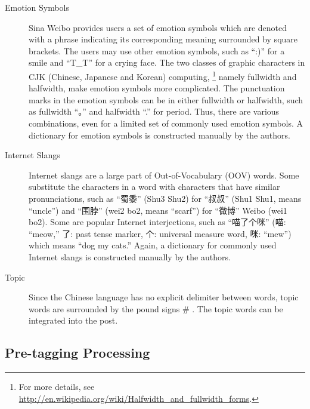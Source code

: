 \documentclass[11pt]{article}
\newcommand{\1}[1]{{\mathbf 1}\left\{#1\right\}}        %
\begin{document}
\begin{description}
\item[Emotion Symbols] Sina Weibo provides users a set of emotion symbols which are denoted with a phrase indicating its corresponding meaning surrounded by square brackets. The users may use other emotion symbols, such as ``:)'' for a smile and ``T\_T'' for a crying face. 
The two classes of graphic characters in CJK (Chinese, Japanese and Korean) computing,
\footnote{For more details, see \url{http://en.wikipedia.org/wiki/Halfwidth_and_fullwidth_forms}.}
 namely fullwidth and halfwidth, make emotion symbols more complicated. The punctuation marks in the emotion symbols can be in either fullwidth or halfwidth, such as fullwidth ``。'' and halfwidth ``.'' for period. Thus, there are various combinations, even for a limited set of commonly used emotion symbols. A dictionary for emotion symbols is constructed manually by the authors.
 
\item[Internet Slangs] 
Internet slangs are a large part of Out-of-Vocabulary (OOV) words. Some substitute the characters in a word with characters that have similar pronunciations, such as ``蜀黍'' (Shu3 Shu2) for ``叔叔'' (Shu1 Shu1, means ``uncle'') and ``围脖'' (wei2 bo2, means ``scarf'') for ``微博'' Weibo (wei1 bo2). Some are popular Internet interjections, such as ``喵了个咪'' (喵: ``meow,'' 了: past tense marker, 个: universal measure word, 咪: ``mew'') which means ``dog my cats.'' Again, a dictionary for commonly used Internet slangs is constructed manually by the authors.


\item[Topic] Since the Chinese language has no explicit delimiter between words, topic words are surrounded by the pound signs {\ttfamily \#} . The topic words can be integrated into the post. 

\end{description}

 




\subsection{Pre-tagging Processing}
\end{document}
